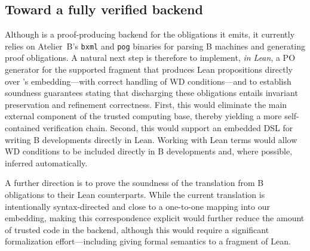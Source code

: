\subsection{Toward a fully verified backend}
\label{sec:verified-backend}

Although \barrel is a proof-producing backend for the obligations it emits, it currently relies on Atelier~B's \texttt{bxml} and \texttt{pog} binaries for parsing B machines and generating proof obligations.
A natural next step is therefore to implement, \emph{in Lean}, a PO generator for the supported fragment that produces Lean propositions directly over \barrel's embedding---with correct handling of WD conditions---and to establish soundness guarantees stating that discharging these obligations entails invariant preservation and refinement correctness.
First, this would eliminate the main external component of the trusted computing base, thereby yielding a more self-contained verification chain.
Second, this would support an embedded DSL for writing B developments directly in Lean.
Working with Lean terms would allow WD conditions to be included directly in B developments and, where possible, inferred automatically.

A further direction is to prove the soundness of the translation from B obligations to their Lean counterparts.
While the current translation is intentionally syntax-directed and close to a one-to-one mapping into our embedding, making this correspondence explicit would further reduce the amount of trusted code in the backend, although this would require a significant formalization effort---including giving formal semantics to a fragment of Lean.
